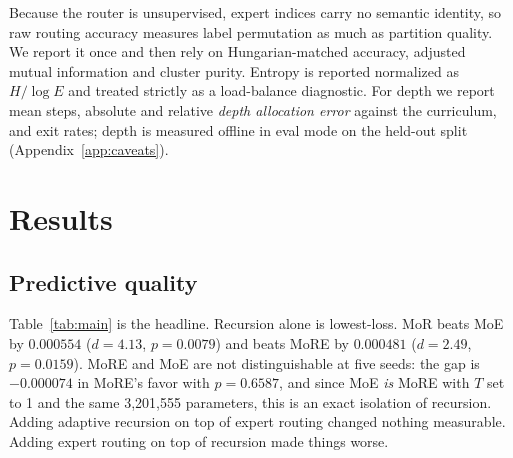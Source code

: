 \documentclass{article}
\begin{document}
Because the router is unsupervised, expert indices carry no semantic identity,
so raw routing accuracy measures label permutation as much as partition quality.
We report it once and then rely on Hungarian-matched accuracy, adjusted mutual
information \citep{vinh2010ami} and cluster purity. Entropy is reported
normalized as $H/\log E$ and treated strictly as a load-balance diagnostic. For
depth we report mean steps, absolute and relative \emph{depth allocation error}
against the curriculum, and exit rates; depth is measured offline in eval mode
on the held-out split (Appendix~\ref{app:caveats}).

\section{Results}

\subsection{Predictive quality}
\label{sec:quality}

Table~\ref{tab:main} is the headline. Recursion alone is lowest-loss. MoR
beats MoE by $0.000554$ ($d = 4.13$, $p = 0.0079$) and beats MoRE by
$0.000481$ ($d = 2.49$, $p = 0.0159$). MoRE and MoE are not distinguishable at
five seeds: the gap is $-0.000074$ in MoRE's favor with $p = 0.6587$, and
since MoE \emph{is} MoRE with $T$ set to 1 and the same 3{,}201{,}555
parameters, this is an exact isolation of recursion. Adding adaptive recursion
on top of expert routing changed nothing measurable. Adding expert routing on
top of recursion made things worse.
\end{document}
